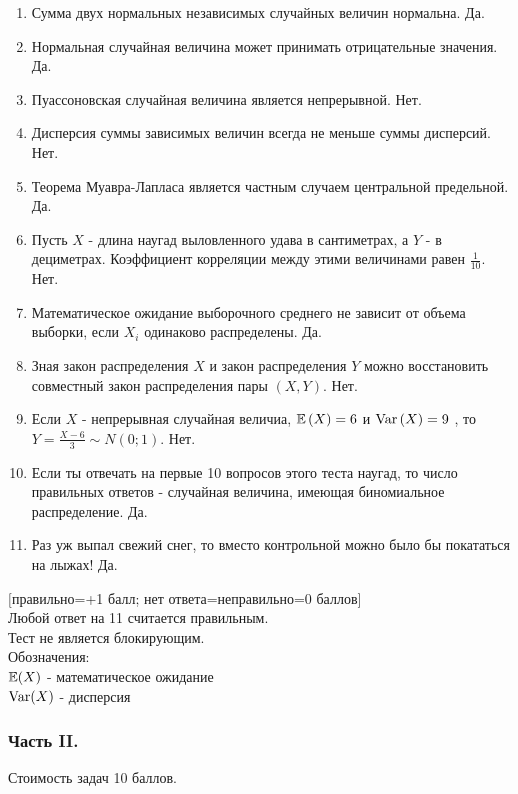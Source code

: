 \documentclass[12pt, a4paper]{article}\usepackage[]{graphicx}\usepackage[]{color}
\begin{document}
\begin{enumerate}
\item Сумма двух нормальных независимых случайных величин нормальна.
Да.
\item Нормальная случайная величина может принимать отрицательные
значения. Да.
\item Пуассоновская случайная величина является непрерывной. Нет.
\item Дисперсия суммы зависимых величин всегда не меньше суммы
дисперсий. Нет.
\item Теорема Муавра-Лапласа является частным случаем центральной
предельной. Да.
\item Пусть $X$ - длина наугад выловленного удава в сантиметрах, а
$Y$ - в дециметрах. Коэффициент корреляции между этими
величинами равен $\frac{1}{10}$. Нет.
\item Математическое ожидание выборочного среднего не зависит от
объема выборки, если $X_{i}$ одинаково распределены. Да.
\item Зная закон распределения $X$ и закон распределения $Y$
можно восстановить совместный закон распределения пары $(X,Y)$. Нет.
\item Если  $X$  - непрерывная случайная величиа,  $\mathbb{E}\left(X\right)=6$  и
$\operatorname{Var}\left(X\right)=9$ , то  $Y=\frac{X-6}{3} \sim
N\left(0;1\right)$.  Нет.
\item Если ты отвечать на первые 10 вопросов этого теста наугад, то
число правильных ответов - случайная величина, имеющая
биномиальное распределение. Да.
\item Раз уж выпал свежий снег, то вместо контрольной можно
было бы покататься на лыжах! Да.
\end{enumerate}

$[$правильно=+1 балл; нет ответа=неправильно=0 баллов$]$ \\
Любой ответ на 11 считается правильным. \\
Тест не является блокирующим. \\
Обозначения: \\
$\mathbb{E}(X)$ - математическое ожидание \\
$\operatorname{Var}(X)$ - дисперсия

\subsubsection*{Часть II.}

Стоимость задач 10 баллов.
\end{document}
